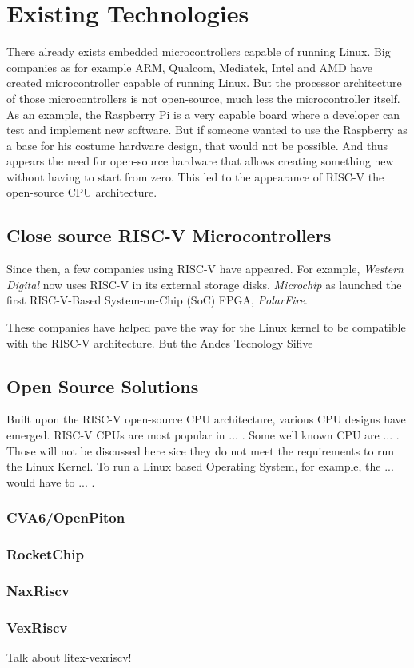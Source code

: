 \chapter{Existing Technologies}
There already exists embedded microcontrollers capable of running Linux. Big companies as for example ARM, Qualcom, Mediatek, Intel and AMD have created microcontroller capable of running Linux. But the processor architecture of those microcontrollers is not open-source, much less the microcontroller itself. As an example, the Raspberry Pi is a very capable board where a developer can test and implement new software. But if someone wanted to use the Raspberry as a base for his costume hardware design, that would not be possible. And thus appears the need for open-source hardware that allows creating something new without having to start from zero. This led to the appearance of RISC-V the open-source CPU architecture.

\section{Close source RISC-V Microcontrollers}
Since then, a few companies using RISC-V have appeared. For example, \textit{Western Digital} now uses RISC-V in its external storage disks. \textit{Microchip} as launched the first RISC-V-Based System-on-Chip (SoC) FPGA, \textit{PolarFire}. 

These companies have helped pave the way for the Linux kernel to be compatible with the RISC-V architecture. But the 
Andes Tecnology
Sifive

\section{Open Source Solutions}
Built upon the RISC-V open-source CPU architecture, various CPU designs have emerged. RISC-V CPUs are most popular in ... . Some well known CPU are ... . Those will not be discussed here sice they do not meet the requirements to run the Linux Kernel. To run a Linux based Operating System, for example, the ... would have to ... .

\subsection{CVA6/OpenPiton}
\subsection{RocketChip}
\subsection{NaxRiscv}
\subsection{VexRiscv}
Talk about litex-vexriscv!